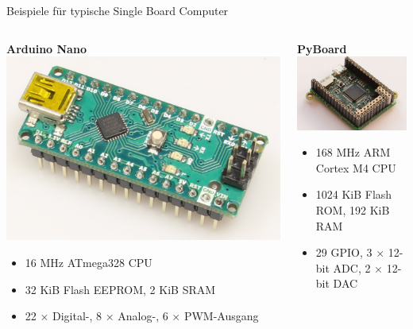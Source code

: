{
\scriptsize

\begin{frame}{Beispiele für typische Single Board Computer}
    \begin{columns}
        \begin{column}[b]{.5\textwidth}
            \textbf{Arduino Nano} \\
            \smallskip
            \includegraphics[width=.5\textwidth]{img/sbc-arduino_nano}

            \begin{itemize}
                \setlength{\itemindent}{-1em}
                \setlength\itemsep{0em}
                \item 16 MHz ATmega328 CPU
                \item 32 KiB Flash EEPROM, 2 KiB SRAM
                \item 22 $\times$ Digital-, 8 $\times$ Analog-, 6 $\times$ PWM-Ausgang
            \end{itemize}
        \end{column}

        \begin{column}[b]{.5\textwidth}
            \textbf{PyBoard} \\
            \smallskip
            \includegraphics[width=.5\textwidth]{img/sbc-pyboard}

            \begin{itemize}
                \setlength{\itemindent}{-1em}
                \setlength\itemsep{0em}
                \item 168 MHz ARM Cortex M4 CPU
                \item 1024 KiB Flash ROM, 192 KiB RAM
                \item 29 GPIO, 3 $\times$ 12-bit ADC, 2 $\times$ 12-bit DAC
            \end{itemize}
        \end{column}
    \end{columns}


\end{frame}}
